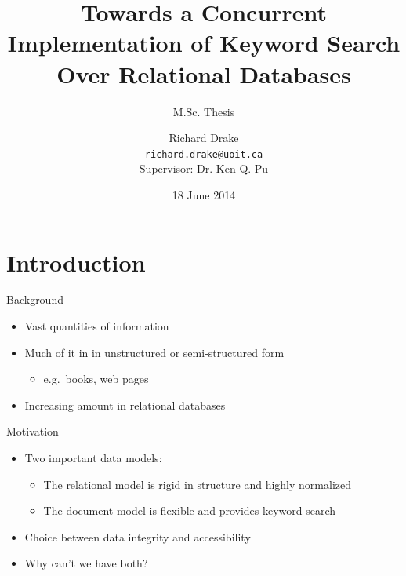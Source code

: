 \documentclass[compress]{beamer}
\title[M.Sc. Thesis -- \insertframenumber/\inserttotalframenumber]{Towards a Concurrent Implementation of Keyword Search Over Relational Databases}
\subtitle{M.Sc. Thesis}
\author[\copyright 2014 Richard Drake]{Richard Drake \\ \vspace{0.3em} \scriptsize{\texttt{richard.drake@uoit.ca}} \\ \vspace{1em} \tiny Supervisor:  Dr. Ken Q. Pu}
\institute[UOIT]{University of Ontario Institute of Technology \\ Oshawa, Ontario, Canada}
\date{\tiny 18 June 2014}
\begin{document}
	
	\frame{\maketitle}
	
	
	\section{Introduction}
		\begin{frame}{Background}
			\begin{itemize}
				\item Vast quantities of information
				\item Much of it in in unstructured or semi-structured form
					\begin{itemize}
						\item e.g.~books, web pages
					\end{itemize}
				\item Increasing amount in relational databases
			\end{itemize}
		\end{frame}
		
		\begin{frame}{Motivation}
			\begin{itemize}
				\item Two important data models:
					\begin{itemize}
						\item The \alert{relational model} is rigid in structure and highly normalized
						\item The \alert{document model} is flexible and provides keyword search
					\end{itemize}
				\item Choice between data \alert{integrity} and \alert{accessibility}
				\item Why can't we have both?
			\end{itemize}
		\end{frame}
		
\end{document}
